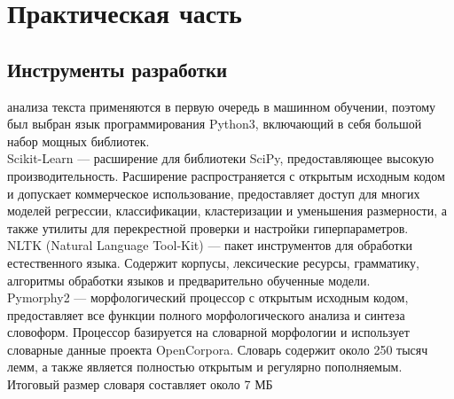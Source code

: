 \documentclass{article}
\newcommand\tab[1][1cm]{\hspace*{#1}}
\begin{document}
\section{Практическая часть}
\subsection{Инструменты разработки}
 анализа текста применяются в первую очередь в машинном обучении, поэтому был выбран язык программирования Python3, включающий в себя большой набор мощных библиотек.\\
\tab Scikit-Learn — расширение для библиотеки SciPy, предоставляющее высокую производительность. Расширение распространяется с открытым исходным кодом и допускает коммерческое использование, предоставляет доступ для многих моделей регрессии, классификации, кластеризации и уменьшения размерности, а также утилиты для перекрестной проверки и настройки гиперпараметров.\\
\tab NLTK (Natural Language Tool-Kit) — пакет инструментов для обработки естественного языка. Содержит корпусы, лексические ресурсы, грамматику, алгоритмы обработки языков и предварительно обученные модели.\\
\tab Pymorphy2 — морфологический процессор с открытым исходным кодом, предоставляет все функции полного морфологического анализа и синтеза словоформ. Процессор базируется на словарной морфологии и использует словарные данные проекта OpenCorpora. Словарь содержит около 250 тысяч лемм, а также является полностью открытым и регулярно пополняемым. Итоговый размер словаря составляет около 7 МБ
\end{document}
